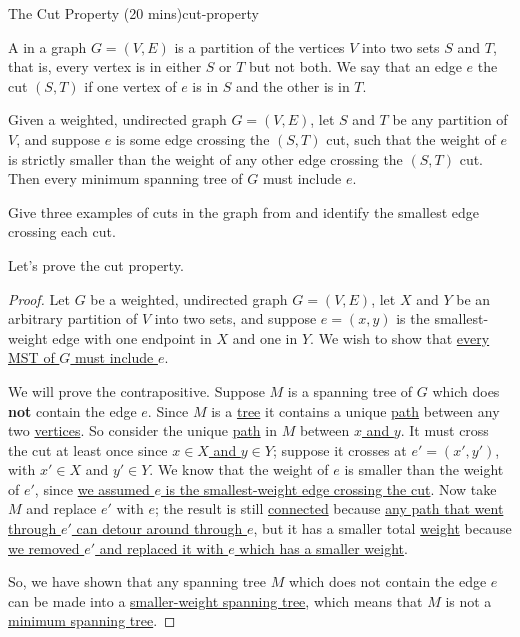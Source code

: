 \documentclass{tufte-handout}
\begin{document}
\begin{model*}{The Cut Property (20 mins)}{cut-property}
  \begin{center}
    
  \end{center}

  \begin{defn}
    A  in a graph $G = (V,E)$ is a partition of the vertices
    $V$ into two sets $S$ and $T$, that is, every vertex is in either
    $S$ or $T$ but not both.  We say that an edge $e$ 
    the cut $(S,T)$ if one vertex of $e$ is in $S$ and the other is in
    $T$.
  \end{defn}

  \begin{thm}
    Given a weighted, undirected graph $G = (V,E)$, let $S$ and $T$ be
    any partition of $V$, and suppose $e$ is some edge crossing the
    $(S,T)$ cut, such that the weight of $e$ is strictly smaller than
    the weight of any other edge crossing the $(S,T)$ cut.  Then every
    minimum spanning tree of $G$ must include $e$.
  \end{thm}
\end{model*}

\begin{questions}
\item Give three examples of cuts in the graph from
   and identify the smallest edge crossing
  each cut.
\end{questions}

Let's prove the cut property.

\newcommand{\filled}[1]{\underline{#1}}

\begin{proof}
  Let $G$ be a weighted, undirected graph $G = (V,E)$, let $X$ and $Y$
  be an arbitrary partition of $V$ into two sets, and suppose
  $e = (x,y)$ is the smallest-weight edge with one endpoint in $X$ and
  one in $Y$.  We wish to show that \filled{every MST of $G$ must
    include $e$}.

  We will prove the contrapositive. Suppose $M$ is a spanning tree of
  $G$ which does \textbf{not} contain the edge $e$.  Since $M$ is a
  \filled{tree} it contains a unique \filled{path} between any two
  \filled{vertices}. So consider the unique \filled{path} in $M$
  between \filled{$x$ and $y$}. It must cross the cut at least once
  since \filled{$x \in X$ and $y \in Y$}; suppose it crosses at
  $e' = (x',y')$, with $x' \in X$ and $y' \in Y$.  We know that the
  weight of $e$ is smaller than the weight of $e'$, since \filled{we
    assumed $e$ is the smallest-weight edge crossing the cut}. Now
  take $M$ and replace \filled{$e'$} with \filled{$e$}; the result is
  still \filled{connected} because \filled{any path that went through
    $e'$ can detour around through $e$}, but it has a smaller total
  \filled{weight} because \filled{we removed $e'$ and replaced it with
  $e$ which has a smaller weight}.

So, we have shown that any spanning tree $M$ which does not contain
the edge $e$ can be made into a \filled{smaller-weight spanning tree},
which means that $M$ is not a \filled{minimum spanning tree}.
\end{proof}
\end{document}
